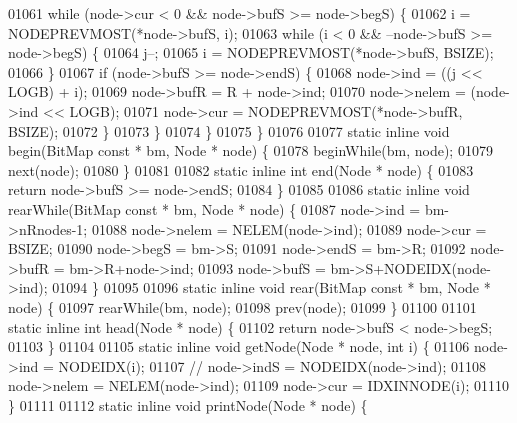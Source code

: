 \begin{DoxyCode}
01061                 \textcolor{keywordflow}{while} (node->cur < 0 && node->bufS >= node->begS) \{
01062                         i = NODEPREVMOST(*node->bufS, i);
01063                         \textcolor{keywordflow}{while} (i < 0 && --node->bufS >= node->begS) \{
01064                                 j--;
01065                                 i = NODEPREVMOST(*node->bufS, BSIZE);
01066                         \}
01067                         \textcolor{keywordflow}{if} (node->bufS >= node->endS) \{
01068                                 node->ind = ((j << LOGB) + i);
01069                                 node->bufR = R + node->ind;
01070                                 node->nelem = (node->ind << LOGB);
01071                                 node->cur = NODEPREVMOST(*node->bufR, BSIZE);
01072                         \}
01073                 \}
01074         \}
01075 \}
01076 
01077 \textcolor{keyword}{static} \textcolor{keyword}{inline} \textcolor{keywordtype}{void} begin(BitMap \textcolor{keyword}{const} * bm, Node * node) \{
01078         beginWhile(bm, node);
01079         next(node);
01080 \}
01081 
01082 \textcolor{keyword}{static} \textcolor{keyword}{inline} \textcolor{keywordtype}{int} end(Node * node) \{
01083         \textcolor{keywordflow}{return} node->bufS >= node->endS;
01084 \}
01085 
01086 \textcolor{keyword}{static} \textcolor{keyword}{inline} \textcolor{keywordtype}{void} rearWhile(BitMap \textcolor{keyword}{const} * bm, Node * node) \{
01087         node->ind = bm->nRnodes-1;
01088         node->nelem = NELEM(node->ind);
01089         node->cur = BSIZE;
01090         node->begS = bm->S;
01091         node->endS = bm->R;
01092         node->bufR = bm->R+node->ind;
01093         node->bufS = bm->S+NODEIDX(node->ind);
01094 \}
01095 
01096 \textcolor{keyword}{static} \textcolor{keyword}{inline} \textcolor{keywordtype}{void} rear(BitMap \textcolor{keyword}{const} * bm, Node * node) \{
01097         rearWhile(bm, node);
01098         prev(node);
01099 \}
01100 
01101 \textcolor{keyword}{static} \textcolor{keyword}{inline} \textcolor{keywordtype}{int} head(Node * node) \{
01102         \textcolor{keywordflow}{return} node->bufS < node->begS;
01103 \}
01104 
01105 \textcolor{keyword}{static} \textcolor{keyword}{inline} \textcolor{keywordtype}{void} getNode(Node * node, \textcolor{keywordtype}{int} i) \{
01106         node->ind = NODEIDX(i);
01107 \textcolor{comment}{//      node->indS = NODEIDX(node->ind);}
01108         node->nelem = NELEM(node->ind);
01109         node->cur = IDXINNODE(i);
01110 \}
01111 
01112 \textcolor{keyword}{static} \textcolor{keyword}{inline} \textcolor{keywordtype}{void} printNode(Node * node) \{

\end{DoxyCode}
